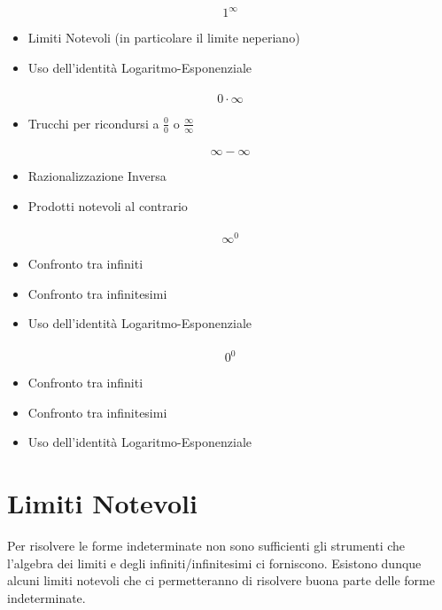 \paragraph*{}$$1^\infty$$
\begin{itemize}
	\item Limiti Notevoli (in particolare il limite neperiano)
	\item Uso dell'identità Logaritmo-Esponenziale
\end{itemize}
\paragraph*{}$$0\cdot \infty$$
\begin{itemize}
	\item Trucchi per ricondursi a $\frac{0}{0}$ o $\frac{\infty}{\infty}$
\end{itemize}
\paragraph*{}$$\infty-\infty$$
\begin{itemize}
	\item Razionalizzazione Inversa
	\item Prodotti notevoli al contrario
\end{itemize}
\paragraph*{}$$\infty^0$$
\begin{itemize}
	\item Confronto tra infiniti
	\item Confronto tra infinitesimi
	\item Uso dell'identità Logaritmo-Esponenziale
\end{itemize}
\paragraph*{}$$0^0$$
\begin{itemize}
	\item Confronto tra infiniti
	\item Confronto tra infinitesimi
	\item Uso dell'identità Logaritmo-Esponenziale
\end{itemize}

\section{Limiti Notevoli}
Per risolvere le forme indeterminate non sono sufficienti gli strumenti che l'algebra dei limiti e degli infiniti/infinitesimi ci forniscono.
Esistono dunque alcuni limiti notevoli che ci permetteranno di risolvere buona parte delle forme indeterminate.


